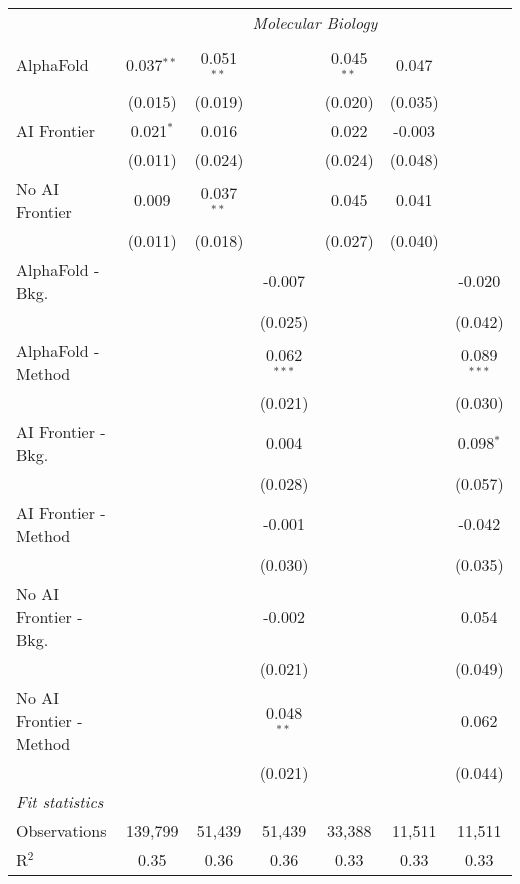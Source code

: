 \begin{tabular}{lcccccc}
 & \multicolumn{6}{c}{\textit{Molecular Biology}} \\ \\
   AlphaFold               & 0.037$^{**}$ & 0.051$^{**}$ &               & 0.045$^{**}$ & 0.047   &   \\   
                           & (0.015)      & (0.019)      &               & (0.020)      & (0.035) &   \\   
   AI Frontier             & 0.021$^{*}$  & 0.016        &               & 0.022        & -0.003  &   \\   
                           & (0.011)      & (0.024)      &               & (0.024)      & (0.048) &   \\   
   No AI Frontier          & 0.009        & 0.037$^{**}$ &               & 0.045        & 0.041   &   \\   
                           & (0.011)      & (0.018)      &               & (0.027)      & (0.040) &   \\   
   AlphaFold - Bkg.        &              &              & -0.007        &              &         & -0.020\\   
                           &              &              & (0.025)       &              &         & (0.042)\\   
   AlphaFold - Method      &              &              & 0.062$^{***}$ &              &         & 0.089$^{***}$\\   
                           &              &              & (0.021)       &              &         & (0.030)\\   
   AI Frontier - Bkg.      &              &              & 0.004         &              &         & 0.098$^{*}$\\   
                           &              &              & (0.028)       &              &         & (0.057)\\   
   AI Frontier - Method    &              &              & -0.001        &              &         & -0.042\\   
                           &              &              & (0.030)       &              &         & (0.035)\\   
   No AI Frontier - Bkg.   &              &              & -0.002        &              &         & 0.054\\   
                           &              &              & (0.021)       &              &         & (0.049)\\   
   No AI Frontier - Method &              &              & 0.048$^{**}$  &              &         & 0.062\\   
                           &              &              & (0.021)       &              &         & (0.044)\\   
   \midrule
   \emph{Fit statistics}\\
   Observations            & 139,799      & 51,439       & 51,439        & 33,388       & 11,511  & 11,511\\  
   R$^2$                   & 0.35         & 0.36         & 0.36          & 0.33         & 0.33    & 0.33\\  
   

\end{tabular}
